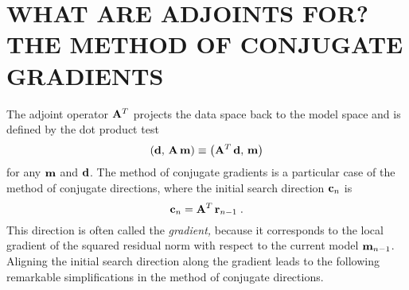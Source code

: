 \section{WHAT ARE ADJOINTS FOR? THE METHOD OF CONJUGATE GRADIENTS}
The adjoint operator ${\bf A}^T$ projects the data space back to the
model space and is defined by the dot product test
\begin{equation}
\left({\bf d},\,{\bf A\,m}\right) \equiv
\left({\bf A}^T\,{\bf d},\,{\bf m}\right)
\label{eqn:dottest}
\end{equation}
for any ${\bf m}$ and ${\bf d}$. The method of conjugate gradients is
a particular case of the method of conjugate directions, where the
initial search direction ${\bf c}_n$ is 
\begin{equation}
{\bf c}_n = {\bf A}^T\,{\bf r}_{n-1}\;.
\label{eqn:gradient}
\end{equation}
This direction is often called the {\em gradient,} because it
corresponds to the local gradient of the squared residual norm with
respect to the current model ${\bf m}_{n-1}$. Aligning the initial
search direction along the gradient leads to the following remarkable
simplifications in the method of conjugate directions.

